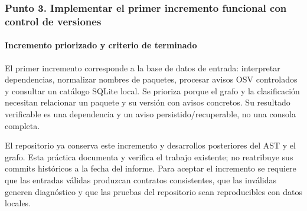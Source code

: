 \subsubsection{Punto 3. Implementar el primer incremento funcional con control de versiones}
\paragraph*{Incremento priorizado y criterio de terminado}
El primer incremento corresponde a la base de datos de entrada: interpretar dependencias, normalizar nombres de paquetes, procesar avisos OSV controlados y consultar un catálogo SQLite local. Se prioriza porque el grafo y la clasificación necesitan relacionar un paquete y su versión con avisos concretos. Su resultado verificable es una dependencia y un aviso persistido/recuperable, no una consola completa.

El repositorio ya conserva este incremento y desarrollos posteriores del AST y el grafo. Esta práctica documenta y verifica el trabajo existente; no reatribuye sus commits históricos a la fecha del informe. Para aceptar el incremento se requiere que las entradas válidas produzcan contratos consistentes, que las inválidas generen diagnóstico y que las pruebas del repositorio sean reproducibles con datos locales.

